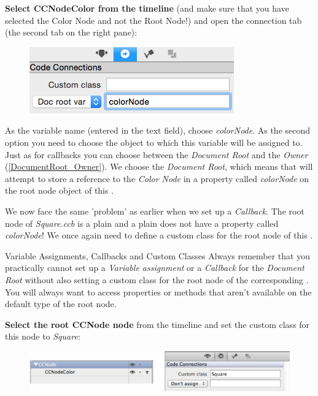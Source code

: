 \begin{leftbar}
\textbf{Select CCNodeColor from the timeline} (and make sure that you
have selected the Color Node and not the Root Node!) and open the connection tab
(the second tab on the right pane):
\begin{figure}[H]
		\centering
		\includegraphics[width=250pt]{images/Chapter1/square_code_connection.png}
\end{figure}
As the variable name (entered in the text field), choose \textit{colorNode}.
As the second option you need to choose the object to which this variable will be
assigned to. Just as for callbacks you can choose between the \textit{Document
Root} and the \textit{Owner} (\ref{DocumentRoot_Owner}). We choose the
\textit{Document Root}, which means that \SB{} will attempt to store a reference
to the \textit{Color Node} in a property called \textit{colorNode}
 on the root node object of this \ccbfile{}.
\end{leftbar}

We now face the same 'problem' as earlier when we set up a
\textit{Callback}. The root node of \textit{Square.ccb} is a plain \ccnode{} and
a plain \ccnode{} does not have a property called
\textit{colorNode}! We once again need to define a custom class for the root
node of this \ccbfile{}.

\begin{details}{Variable Assignments, Callbacks and Custom Classes} 
Always remember that you practically cannot set up a \textit{Variable
assignment} or a \textit{Callback} for the \textit{Document Root} without also
setting a custom class for the root node of the corresponding \ccbfile{}. You
will always want to access properties or methods that aren't available on the
default type of the root node.
\end{details}

\begin{leftbar}
\textbf{Select the root CCNode node} from the timeline and set the custom class
for this node to \textit{Square}:
\begin{figure}[H]
		\centering
		\includegraphics[width=350pt]{images/firstproject/square_custom_class.png}
\end{figure}
\end{leftbar}

